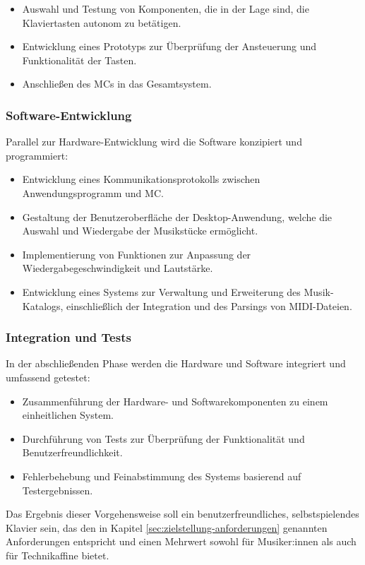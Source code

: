 \begin{itemize}
    \item Auswahl und Testung von Komponenten, die in der Lage sind, die Klaviertasten autonom zu betätigen.
    \item Entwicklung eines Prototyps zur Überprüfung der Ansteuerung und Funktionalität der Tasten.
    \item Anschließen des \ac{MC}s in das Gesamtsystem.
\end{itemize}

\subsubsection{Software-Entwicklung}\label{Vorgehensweise - Software-Entwicklung}

Parallel zur Hardware-Entwicklung wird die Software konzipiert und programmiert:

\begin{itemize}
    \item Entwicklung eines Kommunikationsprotokolls zwischen Anwendungsprogramm und \ac{MC}.
    \item Gestaltung der Benutzeroberfläche der Desktop-Anwendung, welche die Auswahl und Wiedergabe der Musikstücke ermöglicht.
    \item Implementierung von Funktionen zur Anpassung der Wiedergabegeschwindigkeit und Lautstärke.
    \item Entwicklung eines Systems zur Verwaltung und Erweiterung des Musik-Katalogs, einschließlich der Integration und des Parsings von MIDI-Dateien.
\end{itemize}

\subsubsection{Integration und Tests}\label{Vorgehensweise - Integration und Tests}

In der abschließenden Phase werden die Hardware und Software integriert und umfassend getestet:

\begin{itemize}
    \item Zusammenführung der Hardware- und Softwarekomponenten zu einem einheitlichen System.
    \item Durchführung von Tests zur Überprüfung der Funktionalität und Benutzerfreundlichkeit.
    \item Fehlerbehebung und Feinabstimmung des Systems basierend auf Testergebnissen.
\end{itemize}

Das Ergebnis dieser Vorgehensweise soll ein benutzerfreundliches, selbstspielendes Klavier sein,
das den in Kapitel \ref{sec:zielstellung-anforderungen} genannten Anforderungen entspricht und einen Mehrwert sowohl für Musiker:innen als auch für Technikaffine bietet.
